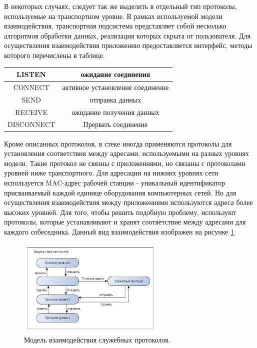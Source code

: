 \documentclass[12pt]{report}
\begin{document}
    В некоторых случаях, следует так же выделить в отдельный тип протоколы, используемые на транспортном уровне. В рамках используемой модели взаимодействия, транспортная подсистема представляет собой несколько алгоритмов обработки данных, реализация которых скрыта от пользователя. Для осуществления взаимодействия приложению предоставляется интерфейс, методы которого перечислены в таблице.


    \begin{tabular}{|c|c|}
        \hline
        LISTEN & ожидание соединения \\ \hline
        CONNECT & активное установление соединение \\ \hline
        SEND & отправка данных \\ \hline
        RECEIVE & ожидание получения данных \\ \hline
        DISCONNECT & Прервать соединение \\ \hline

    \end{tabular}


    Кроме описанных протоколов, в стеке иногда применяются протоколы для установления соответствия между адресами, используемыми на разных уровнях модели. Такие протокол не связны с приложениями, но связаны с протоколами уровней ниже транспортного. Для адресации на нижних уровнях сети используется MAC-адрес рабочей станции - уникальный идентификатор присваиваемый каждой единице оборудования компьютерных сетей. Но для осуществления взаимодействия между приложениями используются адреса более высоких уровней. Для того, чтобы решить подобную проблему, используют протоколы, которые устанавливают и хранят соответствие между адресами для каждого собеседника. Данный вид взаимодействия изображен на рисунке
    \ref{Pic8}.
    \begin{figure}\center
        \includegraphics[width = 70mm]{Ch2Pic8}
        \caption{Модель взаимодействия служебных протоколов.} \label{Pic8}
    \end{figure}
\end{document}
